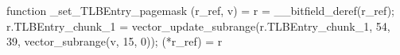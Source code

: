 function _set_TLBEntry_pagemask (r_ref, v) = {
    r = __bitfield_deref(r_ref);
    r.TLBEntry_chunk_1 = vector_update_subrange(r.TLBEntry_chunk_1, 54, 39, vector_subrange(v, 15, 0));
    (*r_ref) = r
}
